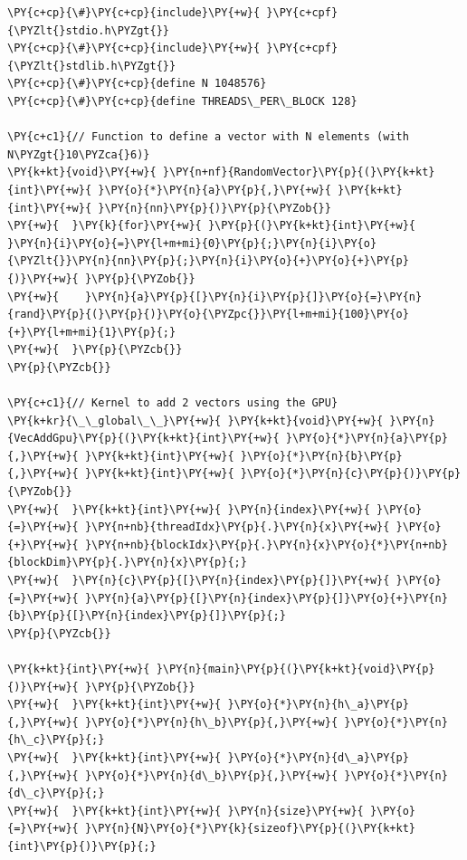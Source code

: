\begin{Verbatim}[label=\makebox{\url{https://github.com/lucabaldini/cmepda/tree/master/slides/latex/snippets/cuda_vec_add_complete.cu}},commandchars=\\\{\}]
\PY{c+cp}{\#}\PY{c+cp}{include}\PY{+w}{ }\PY{c+cpf}{\PYZlt{}stdio.h\PYZgt{}}
\PY{c+cp}{\#}\PY{c+cp}{include}\PY{+w}{ }\PY{c+cpf}{\PYZlt{}stdlib.h\PYZgt{}}
\PY{c+cp}{\#}\PY{c+cp}{define N 1048576}
\PY{c+cp}{\#}\PY{c+cp}{define THREADS\_PER\_BLOCK 128}

\PY{c+c1}{// Function to define a vector with N elements (with N\PYZgt{}10\PYZca{}6)}
\PY{k+kt}{void}\PY{+w}{ }\PY{n+nf}{RandomVector}\PY{p}{(}\PY{k+kt}{int}\PY{+w}{ }\PY{o}{*}\PY{n}{a}\PY{p}{,}\PY{+w}{ }\PY{k+kt}{int}\PY{+w}{ }\PY{n}{nn}\PY{p}{)}\PY{p}{\PYZob{}}
\PY{+w}{  }\PY{k}{for}\PY{+w}{ }\PY{p}{(}\PY{k+kt}{int}\PY{+w}{ }\PY{n}{i}\PY{o}{=}\PY{l+m+mi}{0}\PY{p}{;}\PY{n}{i}\PY{o}{\PYZlt{}}\PY{n}{nn}\PY{p}{;}\PY{n}{i}\PY{o}{+}\PY{o}{+}\PY{p}{)}\PY{+w}{ }\PY{p}{\PYZob{}}
\PY{+w}{    }\PY{n}{a}\PY{p}{[}\PY{n}{i}\PY{p}{]}\PY{o}{=}\PY{n}{rand}\PY{p}{(}\PY{p}{)}\PY{o}{\PYZpc{}}\PY{l+m+mi}{100}\PY{o}{+}\PY{l+m+mi}{1}\PY{p}{;}
\PY{+w}{  }\PY{p}{\PYZcb{}}
\PY{p}{\PYZcb{}}

\PY{c+c1}{// Kernel to add 2 vectors using the GPU}
\PY{k+kr}{\_\_global\_\_}\PY{+w}{ }\PY{k+kt}{void}\PY{+w}{ }\PY{n}{VecAddGpu}\PY{p}{(}\PY{k+kt}{int}\PY{+w}{ }\PY{o}{*}\PY{n}{a}\PY{p}{,}\PY{+w}{ }\PY{k+kt}{int}\PY{+w}{ }\PY{o}{*}\PY{n}{b}\PY{p}{,}\PY{+w}{ }\PY{k+kt}{int}\PY{+w}{ }\PY{o}{*}\PY{n}{c}\PY{p}{)}\PY{p}{\PYZob{}}
\PY{+w}{  }\PY{k+kt}{int}\PY{+w}{ }\PY{n}{index}\PY{+w}{ }\PY{o}{=}\PY{+w}{ }\PY{n+nb}{threadIdx}\PY{p}{.}\PY{n}{x}\PY{+w}{ }\PY{o}{+}\PY{+w}{ }\PY{n+nb}{blockIdx}\PY{p}{.}\PY{n}{x}\PY{o}{*}\PY{n+nb}{blockDim}\PY{p}{.}\PY{n}{x}\PY{p}{;}
\PY{+w}{  }\PY{n}{c}\PY{p}{[}\PY{n}{index}\PY{p}{]}\PY{+w}{ }\PY{o}{=}\PY{+w}{ }\PY{n}{a}\PY{p}{[}\PY{n}{index}\PY{p}{]}\PY{o}{+}\PY{n}{b}\PY{p}{[}\PY{n}{index}\PY{p}{]}\PY{p}{;}
\PY{p}{\PYZcb{}}

\PY{k+kt}{int}\PY{+w}{ }\PY{n}{main}\PY{p}{(}\PY{k+kt}{void}\PY{p}{)}\PY{+w}{ }\PY{p}{\PYZob{}}
\PY{+w}{  }\PY{k+kt}{int}\PY{+w}{ }\PY{o}{*}\PY{n}{h\_a}\PY{p}{,}\PY{+w}{ }\PY{o}{*}\PY{n}{h\_b}\PY{p}{,}\PY{+w}{ }\PY{o}{*}\PY{n}{h\_c}\PY{p}{;}
\PY{+w}{  }\PY{k+kt}{int}\PY{+w}{ }\PY{o}{*}\PY{n}{d\_a}\PY{p}{,}\PY{+w}{ }\PY{o}{*}\PY{n}{d\_b}\PY{p}{,}\PY{+w}{ }\PY{o}{*}\PY{n}{d\_c}\PY{p}{;}
\PY{+w}{  }\PY{k+kt}{int}\PY{+w}{ }\PY{n}{size}\PY{+w}{ }\PY{o}{=}\PY{+w}{ }\PY{n}{N}\PY{o}{*}\PY{k}{sizeof}\PY{p}{(}\PY{k+kt}{int}\PY{p}{)}\PY{p}{;}


\end{Verbatim}
